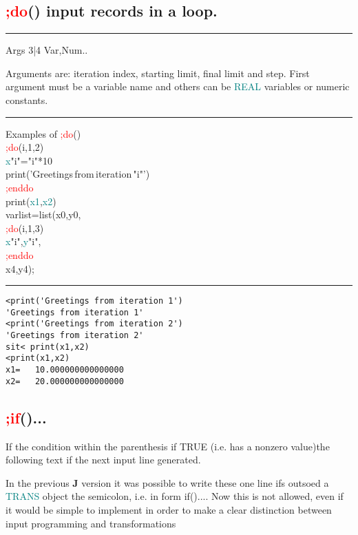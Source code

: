 \subsection{\textcolor{Red}{;do}() input records in a loop.} 
\label{inpudo} 
\vspace{0.3cm} 
\hrule 
\vspace{0.3cm} 
\noindent Args \tabto{3cm} 3|4 \tabto{5cm}  Var,Num.. \tabto{7cm} 
\begin{changemargin}{3cm}{0cm} 
\noindent Arguments are: iteration index, starting limit, 
final limit and step. First argument must be a variable name and others 
can be \textcolor{teal}{REAL} variables or numeric constants. 
\end {changemargin} 
\hrule 
\vspace{0.2cm} 
\singlespacing 
\begin{example}[inpudoex]Examples of \textcolor{Red}{;do}()\\ 
\label{inpudoex} 
\noindent \textcolor{Red}{;do}(i,1,2)\\ 
\textcolor{teal}{x}"i"="i"*10\\ 
\textcolor{VioletRed}{print}('Greetings\,from\,iteration\,"i"')\\ 
\textcolor{Red}{;enddo}\\ 
\textcolor{VioletRed}{print}(\textcolor{teal}{x1},\textcolor{teal}{x2})\\ 
varlist=\textcolor{VioletRed}{list}(x0,y0,\\ 
\textcolor{Red}{;do}(i,1,3)\\ 
\textcolor{teal}{x}"i",\textcolor{teal}{y}"i",\\ 
\textcolor{Red}{;enddo}\\ 
x4,y4);\\ 
\end{example} 
\vspace{-7mm} \rule{5cm}{0.1pt} 
\onehalfspacing 
 
\color{Green} 
\begin{verbatim} 
<print('Greetings from iteration 1') 
'Greetings from iteration 1' 
<print('Greetings from iteration 2') 
'Greetings from iteration 2' 
sit< print(x1,x2) 
<print(x1,x2) 
x1=   10.000000000000000 
x2=   20.000000000000000 
\end{verbatim} 
\color{Black} 
\subsection{\textcolor{Red}{;if}()...} 
\label{inpuif} 
If the condition within the parenthesis if TRUE (i.e. has a nonzero value)the following text if the next input line 
generated. 
\begin{note} 
In the previous \textbf{J} version it was possible to write these one line ifs outsoed a \textcolor{teal}{TRANS} object 
the semicolon, i.e. in form  \textcolor{VioletRed}{if}().... Now this is not allowed, even if it would be simple to implement 
in order to  make a clear distinction between input programming and transformations 
\end{note} 
